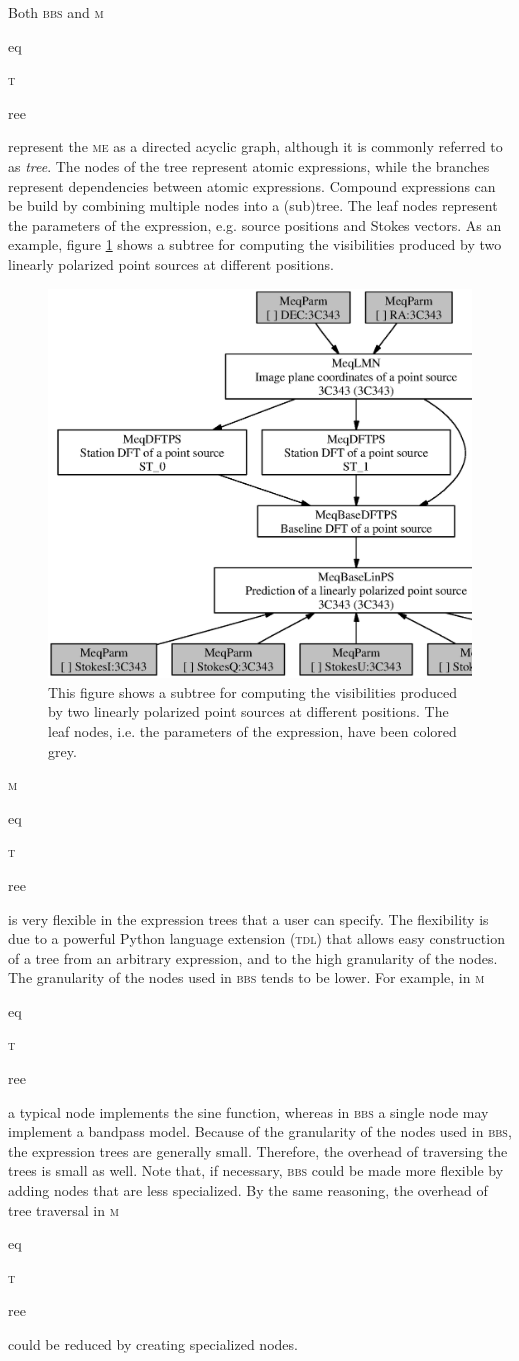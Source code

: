 \documentclass[10pt]{lofar}
\newcommand{\bbs}{\textsc{bbs}\xspace}
\newcommand{\me}{\textsc{me}\xspace}
\newcommand{\meqtree}{\textsc{m}\begin{footnotesize}eq\end{footnotesize}\textsc{t}\begin{footnotesize}ree\end{footnotesize}\xspace}
\begin{document}
Both \bbs and \meqtree represent the \me as a directed acyclic graph, although
it is commonly referred to as \emph{tree}. The nodes of the tree represent
atomic expressions, while the branches represent dependencies between atomic
expressions. Compound expressions can be build by combining multiple nodes into a
(sub)tree. The leaf nodes represent the parameters of the expression, e.g.
source positions and Stokes vectors. As an example, figure \ref{fig:expr_tree}
shows a subtree for computing the visibilities produced by two linearly
polarized point sources at different positions.
\begin{figure}[htbp]
\centering
\includegraphics[width=\textwidth]{images/expr_graph_sdd.ps}
\caption{This figure shows a subtree for computing the visibilities produced by
two linearly polarized point sources at different positions. The leaf nodes,
i.e. the parameters of the expression, have been colored grey.}
\label{fig:expr_tree}
\end{figure}

\meqtree is very flexible in the expression trees that a user can specify. The
flexibility is due to a powerful Python language extension (\textsc{tdl}) that
allows easy construction of a tree from an arbitrary expression, and to the high
granularity of the nodes. The granularity of the nodes used in \bbs tends to be
lower. For example, in \meqtree a typical node implements the sine function,
whereas in \bbs a single node may implement a bandpass model. Because of the
granularity of the nodes used in \bbs, the expression trees are generally small.
Therefore, the overhead of traversing the trees is small as well. Note that, if
necessary, \bbs could be made more flexible by adding nodes that are less
specialized. By the same reasoning, the overhead of tree traversal in \meqtree
could be reduced by creating specialized nodes.
\end{document}
